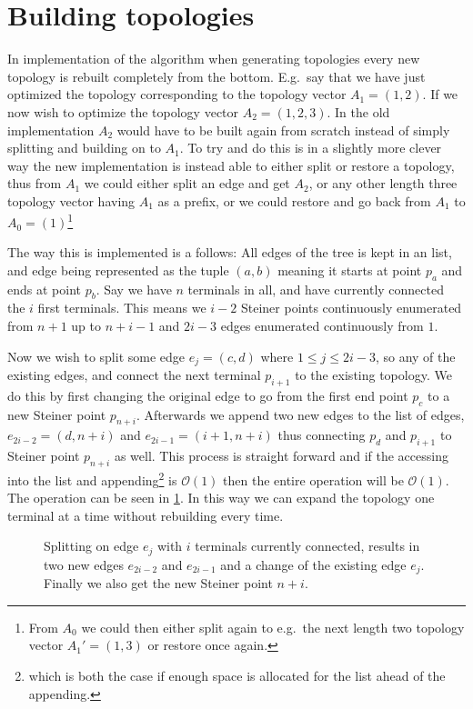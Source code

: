 \section{Building topologies}
\label{sec:building-topologies}

In \textcite{smith1992} implementation of the algorithm when generating
topologies every new topology is rebuilt completely from the bottom. E.g.\ say
that we have just optimized the topology corresponding to the topology vector
$A_1 = (1, 2)$. If we now wish to optimize the topology vector
$A_2 = (1, 2, 3)$. In the old implementation $A_2$ would have to be built again
from scratch instead of simply splitting and building on to $A_1$. To try and do
this is in a slightly more clever way the new implementation is instead able to
either split or restore a topology, thus from $A_1$ we could either split an
edge and get $A_2$, or any other length three topology vector having $A_1$ as a
prefix, or we could restore and go back from $A_1$ to $A_0 = (1)$\footnote{From
  $A_0$ we could then either split again to e.g.\ the next length two topology
  vector $A_1' = (1, 3)$ or restore once again.}

The way this is implemented is a follows: All edges of the tree is kept in an
list, and edge being represented as the tuple $(a, b)$ meaning it starts at
point $p_a$ and ends at point $p_b$. Say we have $n$ terminals in all, and have
currently connected the $i$ first terminals. This means we $i-2$ Steiner points
continuously enumerated from $n+1$ up to $n+i-1$ and $2i-3$ edges enumerated
continuously from $1$.

Now we wish to split some edge $e_j = (c, d)$ where $1 \le j \le 2i-3$, so any
of the existing edges, and connect the next terminal $p_{i+1}$ to the existing
topology. We do this by first changing the original edge to go from the first
end point $p_c$ to a new Steiner point $p_{n+i}$. Afterwards we append two new
edges to the list of edges, $e_{2i-2} = (d, n+i)$ and $e_{2i-1} = (i+1, n+i)$
thus connecting $p_d$ and $p_{i+1}$ to Steiner point $p_{n+i}$ as well. This
process is straight forward and if the accessing into the list and
appending\footnote{which is both the case if enough space is allocated for the
  list ahead of the appending.} is $\mathcal{O}(1)$ then the entire operation
will be $\mathcal{O}(1)$. The operation can be seen in
\cref{fig:splitting-topology}. In this way we can expand the topology one
terminal at a time without rebuilding every time.

\begin{figure}[htbp]
  \centering
  
  \caption[Implementation of topology splitting]{Splitting on edge $e_j$ with
    $i$ terminals currently connected, results in two new edges $e_{2i-2}$ and
    $e_{2i-1}$ and a change of the existing edge $e_j$. Finally we also get the new
    Steiner point $n+i$.\label{fig:splitting-topology}}
\end{figure}

